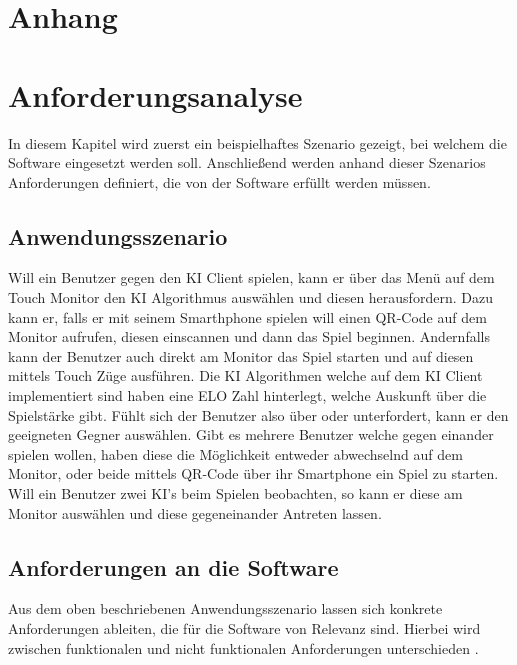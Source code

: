 \documentclass[12pt,a4paper,bibliography=totocnumbered,listof=totocnumbered]{article}
\begin{document}
\begin{appendix}
\section*{Anhang}
{}

\section{Anforderungsanalyse}
\label{apx:Anforderungsanalyse}
In diesem Kapitel wird zuerst ein beispielhaftes Szenario gezeigt, bei welchem die Software eingesetzt werden soll.
Anschließend werden anhand dieser Szenarios Anforderungen definiert, die von der Software erfüllt werden müssen.
\subsection{Anwendungsszenario}
Will ein Benutzer gegen den KI Client spielen, kann er über das Menü auf dem Touch Monitor den KI Algorithmus auswählen und diesen herausfordern.
Dazu kann er, falls er mit seinem Smarthphone spielen will einen QR-Code auf dem Monitor aufrufen, diesen einscannen und dann das Spiel beginnen.
Andernfalls kann der Benutzer auch direkt am Monitor das Spiel starten und auf diesen mittels Touch Züge ausführen.
Die KI Algorithmen welche auf dem KI Client implementiert sind haben eine ELO Zahl hinterlegt, welche Auskunft über die Spielstärke gibt.
Fühlt sich der Benutzer also über oder unterfordert, kann er den geeigneten Gegner auswählen. Gibt es mehrere Benutzer welche 
gegen einander spielen wollen, haben diese die Möglichkeit entweder abwechselnd auf dem Monitor, oder beide mittels QR-Code über ihr Smartphone ein Spiel zu starten.
Will ein Benutzer zwei KI's beim Spielen beobachten, so kann er diese am Monitor auswählen und diese gegeneinander Antreten lassen.
\subsection{Anforderungen an die Software}
Aus dem oben beschriebenen Anwendungsszenario lassen sich konkrete Anforderungen ableiten, die für die Software von Relevanz sind.
Hierbei wird zwischen funktionalen und nicht funktionalen Anforderungen unterschieden \cite{RequirementEngenieering}.

\end{appendix}
\end{document}
